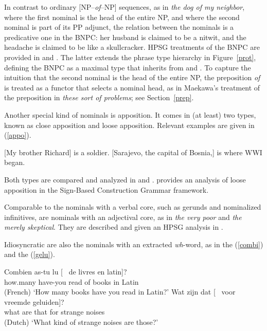 \documentclass[output=paper,biblatex,babelshorthands,newtxmath,draftmode,colorlinks,citecolor=brown]{langscibook}
\begin{document}
\noindent
In contrast to ordinary [NP--\emph{of}--NP] sequences, 
as in \emph{the dog of my neighbor}, where the 
first nominal is the head of the entire NP, and where the second 
nominal is part of its PP adjunct, 
the relation between the nominals is a predicative one in the BNPC: 
her husband is claimed to be a nitwit, and the headache is claimed to be 
like a skullcracker. HPSG treatments of the BNPC are provided in
\citet{KimSells14} and \citet{VanEynde18}. The latter extends 
the phrase type hierarchy in Figure~\ref{prot}, defining the BNPC as 
a maximal type that inherits from  and 
. To capture the intuition that the second
nominal is the head of the entire NP, the preposition \emph{of} is 
treated as a functor that selects a nominal head, as in Maekawa's treatment of 
the preposition in \emph{these sort of problems}; see Section~\ref{prep}. 

Another special kind of nominals is apposition. It comes in (at least) two types, known as 
close apposition and loose apposition. Relevant examples are given in (\ref{appo}). 

\begin{exe} 
\ex\label{appo} 
\begin{xlist} 
\ex  {}[My brother Richard] is a soldier.  
\ex  {}[Sarajevo, the capital of Bosnia,] is where WWI began.
\end{xlist} 
\end{exe}

\noindent
Both types are compared and analyzed in \citet{Kim12} and \citet{Kim14}. 
\citet{VanEyndeKim16} provides an analysis of loose apposition in the 
Sign-Based Construction Grammar framework. 

Comparable to the nominals with a verbal core, such as gerunds and nominalized 
infinitives, are nominals with an adjectival core, as in \emph{the very poor} and 
\emph{the merely skeptical}. They are described and given an HPSG analysis 
in \citet{ArnoldSpencer2015}.

Idiosyncratic are also the nominals with an extracted \emph{wh}-word, as in 
the  (\ref{combi}) and the  (\ref{gelu}). 

\begin{exe} 
\ex\label{combi}  
\gll   Combien as-tu lu [~\trace{} de livres en latin]?  \\
       how.many have-you read {} of books in Latin  \\\hfill(French)
\trans `How many books have you read in Latin?' 
\ex\label{gelu}
\gll   Wat zijn dat [~\trace{} voor vreemde geluiden]? \\
       what are that {} for strange noises        \\\hfill(Dutch)
\trans `What kind of strange noises are those?'  
\end{exe} 
\end{document}
